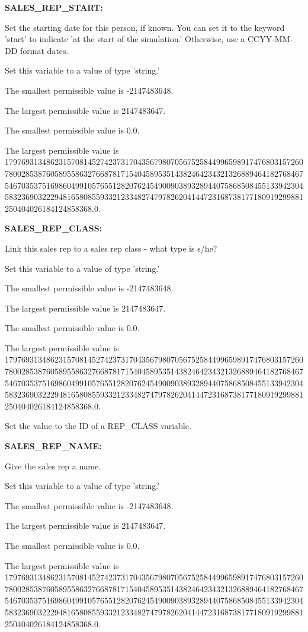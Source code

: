 \textbf{SALES\_REP\_START:}


Set the starting date for this person, if known.  You can set it to the keyword 'start' to indicate 'at the start of the simulation.'  Otherwise, use a CCYY-MM-DD format dates.

Set this variable to a value of type 'string.'

The smallest permissible value is -2147483648.

The largest permissible value is 2147483647.

The smallest permissible value is 0.0.

The largest permissible value is 179769313486231570814527423731704356798070567525844996598917476803157260780028538760589558632766878171540458953514382464234321326889464182768467546703537516986049910576551282076245490090389328944075868508455133942304583236903222948165808559332123348274797826204144723168738177180919299881250404026184124858368.0.


\textbf{SALES\_REP\_CLASS:}


Link this sales rep to a sales rep class - what type is s/he?

Set this variable to a value of type 'string.'

The smallest permissible value is -2147483648.

The largest permissible value is 2147483647.

The smallest permissible value is 0.0.

The largest permissible value is 179769313486231570814527423731704356798070567525844996598917476803157260780028538760589558632766878171540458953514382464234321326889464182768467546703537516986049910576551282076245490090389328944075868508455133942304583236903222948165808559332123348274797826204144723168738177180919299881250404026184124858368.0.

Set the value to the ID of a REP\_CLASS variable.


\textbf{SALES\_REP\_NAME:}


Give the sales rep a name.

Set this variable to a value of type 'string.'

The smallest permissible value is -2147483648.

The largest permissible value is 2147483647.

The smallest permissible value is 0.0.

The largest permissible value is 179769313486231570814527423731704356798070567525844996598917476803157260780028538760589558632766878171540458953514382464234321326889464182768467546703537516986049910576551282076245490090389328944075868508455133942304583236903222948165808559332123348274797826204144723168738177180919299881250404026184124858368.0.


